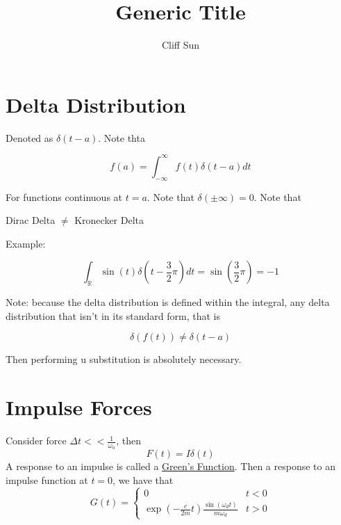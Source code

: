 \documentclass{article}
\title{Generic Title}
\author{Cliff Sun}
\newtheorem{one minute paper}[theorem]{One Minute Paper}
\begin{document}
\maketitle

\section*{Delta Distribution}

Denoted as $\delta(t - a)$. Note thta 

\begin{equation}
    f(a) = \int_{-\infty}^{\infty}f(t)\delta(t-a)dt
\end{equation}

For functions continuous at $t = a$. Note that $\delta(\pm\infty) = 0$. Note that 
\begin{center}
    Dirac Delta $\neq$ Kronecker Delta
\end{center}

Example:

\begin{equation}
    \int_\mathbb{R}\sin(t)\delta(t-\frac{3}{2}\pi)dt = \sin(\frac{3}{2}\pi) = -1
\end{equation}

Note: because the delta distribution is defined within the integral, any delta distribution that isn't in its standard form, that is 

\begin{equation}
    \delta(f(t)) \neq \delta(t - a)
\end{equation}

Then performing u substitution is absolutely necessary. 

\section*{Impulse Forces}

Consider force $\Delta t << \frac{1}{\omega_n}$, then 
\begin{equation}
    F(t) = I\delta(t)
\end{equation}
A response to an impulse is called a \underline{Green's Function}. Then a response to an impulse function at $t=0$, we have that 
\begin{equation}
    G(t) = \begin{cases}
        0 & t< 0 \\
        \exp(-\frac{c}{2m}t)\frac{\sin(\omega_d t)}{m\omega_d} & t > 0
    \end{cases}
\end{equation}
\end{document}
